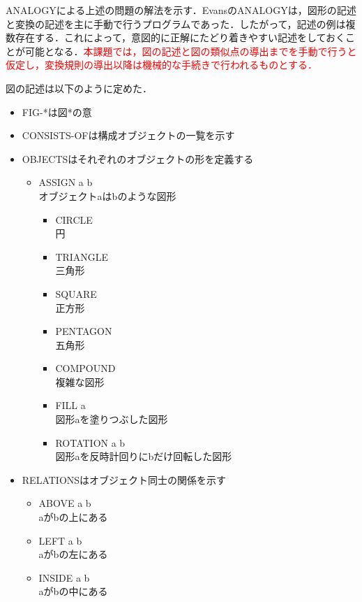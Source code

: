 \documentclass{jarticle}
\begin{document}
ANALOGYによる上述の問題の解法を示す．EvansのANALOGYは，図形の記述と変換の記述を主に手動で行うプログラムであった\cite{ref:automation}．したがって，記述の例は複数存在する．これによって，意図的に正解にたどり着きやすい記述をしておくことが可能となる．\textcolor{red}{本課題では，図の記述と図の類似点の導出までを手動で行うと仮定し，変換規則の導出以降は機械的な手続きで行われるものとする．}

図の記述は以下のように定めた．
\begin{itemize}
\item FIG-*は図*の意
\item CONSISTS-OFは構成オブジェクトの一覧を示す
\item OBJECTSはそれぞれのオブジェクトの形を定義する
	\begin{itemize}
	\item ASSIGN a b\\
		オブジェクトaはbのような図形
		\begin{itemize}
		\item CIRCLE\\
			円
		\item TRIANGLE\\
			三角形
		\item SQUARE\\
			正方形
		\item PENTAGON\\
			五角形
		\item COMPOUND\\
			複雑な図形
		\item FILL a\\
			図形aを塗りつぶした図形
		\item ROTATION a b\\
			図形aを反時計回りにbだけ回転した図形
	\end{itemize}

	\end{itemize}
	\item RELATIONSはオブジェクト同士の関係を示す
	\begin{itemize}
	\item ABOVE a b\\
		aがbの上にある
	\item LEFT a b\\
		aがbの左にある
	\item INSIDE a b\\
		aがbの中にある
	\end{itemize}
\end{itemize}
\end{document}
